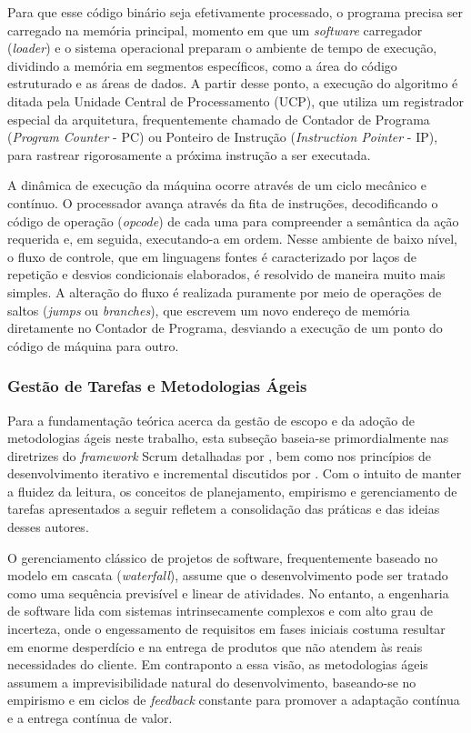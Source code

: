 Para que esse código binário seja efetivamente processado, o programa precisa ser carregado na memória principal, momento em que um \textit{software} carregador (\textit{loader}) e o sistema operacional preparam o ambiente de tempo de execução, dividindo a memória em segmentos específicos, como a área do código estruturado e as áreas de dados.
A partir desse ponto, a execução do algoritmo é ditada pela Unidade Central de Processamento (UCP), que utiliza um registrador especial da arquitetura, frequentemente chamado de Contador de Programa (\textit{Program Counter} - PC) ou Ponteiro de Instrução (\textit{Instruction Pointer} - IP), para rastrear rigorosamente a próxima instrução a ser executada.

A dinâmica de execução da máquina ocorre através de um ciclo mecânico e contínuo. O processador avança através da fita de instruções, decodificando o código de operação (\textit{opcode}) de cada uma para compreender a semântica da ação requerida e, em seguida, executando-a em ordem.
Nesse ambiente de baixo nível, o fluxo de controle, que em linguagens fontes é caracterizado por laços de repetição e desvios condicionais elaborados, é resolvido de maneira muito mais simples.
A alteração do fluxo é realizada puramente por meio de operações de saltos (\textit{jumps} ou \textit{branches}), que escrevem um novo endereço de memória diretamente no Contador de Programa, desviando a execução de um ponto do código de máquina para outro.


\subsubsection{Gestão de Tarefas e Metodologias Ágeis}

Para a fundamentação teórica acerca da gestão de escopo e da adoção de metodologias ágeis neste trabalho, esta subseção baseia-se primordialmente nas diretrizes do \textit{framework} Scrum detalhadas por , bem como nos princípios de desenvolvimento iterativo e incremental discutidos por . Com o intuito de manter a fluidez da leitura, os conceitos de planejamento, empirismo e gerenciamento de tarefas apresentados a seguir refletem a consolidação das práticas e das ideias desses autores. %

O gerenciamento clássico de projetos de software, frequentemente baseado no modelo em cascata (\textit{waterfall}), assume que o desenvolvimento pode ser tratado como uma sequência previsível e linear de atividades. No entanto, a engenharia de software lida com sistemas intrinsecamente complexos e com alto grau de incerteza, onde o engessamento de requisitos em fases iniciais costuma resultar em enorme desperdício e na entrega de produtos que não atendem às reais necessidades do cliente. Em contraponto a essa visão, as metodologias ágeis assumem a imprevisibilidade natural do desenvolvimento, baseando-se no empirismo e em ciclos de \textit{feedback} constante para promover a adaptação contínua e a entrega contínua de valor. %

